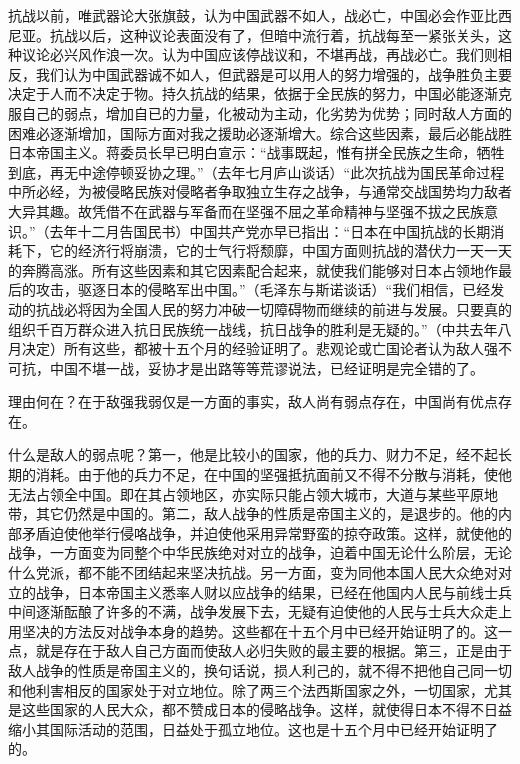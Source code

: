 \documentclass[UTF8, 12pt, a4paper]{ctexrep}
\begin{document}
抗战以前，唯武器论大张旗鼓，认为中国武器不如人，战必亡，中国必会作亚比西尼亚。抗战以后，这种议论表面没有了，但暗中流行着，抗战每至一紧张关头，这种议论必兴风作浪一次。认为中国应该停战议和，不堪再战，再战必亡。我们则相反，我们认为中国武器诚不如人，但武器是可以用人的努力增强的，战争胜负主要决定于人而不决定于物。持久抗战的结果，依据于全民族的努力，中国必能逐渐克服自己的弱点，增加自已的力量，化被动为主动，化劣势为优势；同时敌人方面的困难必逐渐增加，国际方面对我之援助必逐渐增大。综合这些因素，最后必能战胜日本帝国主义。蒋委员长早已明白宣示：“战事既起，惟有拼全民族之生命，牺牲到底，再无中途停顿妥协之理。”（去年七月庐山谈话）“此次抗战为国民革命过程中所必经，为被侵略民族对侵略者争取独立生存之战争，与通常交战国势均力敌者大异其趣。故凭借不在武器与军备而在坚强不屈之革命精神与坚强不拔之民族意识。”（去年十二月告国民书）中国共产党亦早已指出：“日本在中国抗战的长期消耗下，它的经济行将崩溃，它的士气行将颓靡，中国方面则抗战的潜伏力一天一天的奔腾高涨。所有这些因素和其它因素配合起来，就使我们能够对日本占领地作最后的攻击，驱逐日本的侵略军出中国。”（毛泽东与斯诺谈话）“我们相信，已经发动的抗战必将因为全国人民的努力冲破一切障碍物而继续的前进与发展。只要真的组织千百万群众进入抗日民族统一战线，抗日战争的胜利是无疑的。”（中共去年八月决定）所有这些，都被十五个月的经验证明了。悲观论或亡国论者认为敌人强不可抗，中国不堪一战，妥协才是出路等等荒谬说法，已经证明是完全错的了。

理由何在？在于敌强我弱仅是一方面的事实，敌人尚有弱点存在，中国尚有优点存在。

什么是敌人的弱点呢？第一，他是比较小的国家，他的兵力、财力不足，经不起长期的消耗。由于他的兵力不足，在中国的坚强抵抗面前又不得不分散与消耗，使他无法占领全中国。即在其占领地区，亦实际只能占领大城市，大道与某些平原地带，其它仍然是中国的。第二，敌人战争的性质是帝国主义的，是退步的。他的内部矛盾迫使他举行侵咯战争，并迫使他采用异常野蛮的掠夺政策。这样，就使他的战争，一方面变为同整个中华民族绝对对立的战争，迫着中国无论什么阶层，无论什么党派，都不能不团结起来坚决抗战。另一方面，变为同他本国人民大众绝对对立的战争，日本帝国主义悉率人财以应战争的结果，已经在他国内人民与前线士兵中间逐渐酝酿了许多的不满，战争发展下去，无疑有迫使他的人民与士兵大众走上用坚决的方法反对战争本身的趋势。这些都在十五个月中已经开始证明了的。这一点，就是存在于敌人自己方面而使敌人必归失败的最主要的根据。第三，正是由于敌人战争的性质是帝国主义的，换句话说，损人利己的，就不得不把他自己同一切和他利害相反的国家处于对立地位。除了两三个法西斯国家之外，一切国家，尤其是这些国家的人民大众，都不赞成日本的侵略战争。这样，就使得日本不得不日益缩小其国际活动的范围，日益处于孤立地位。这也是十五个月中已经开始证明了的。
\end{document}
